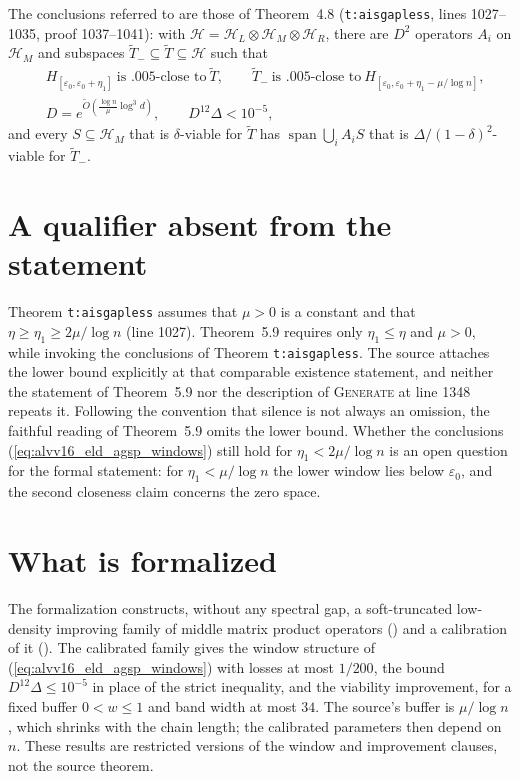 \documentclass{article}
\begin{document}
The conclusions referred to are those of Theorem~4.8
(\texttt{t:aisgapless}, lines 1027--1035, proof 1037--1041): with $\mathcal H=\mathcal H_L\otimes
\mathcal H_M\otimes\mathcal H_R$, there are $D^2$ operators $A_i$ on
$\mathcal H_M$ and subspaces $\tilde T_-\subseteq\tilde T\subseteq\mathcal H$
such that
\begin{align}
 &H_{[\varepsilon_0,\varepsilon_0+\eta_1]}\ \text{is $.005$-close to}\ \tilde T,
 \qquad
 \tilde T_-\ \text{is $.005$-close to}\
 H_{[\varepsilon_0,\varepsilon_0+\eta_1-\mu/\log n]},
 \label{eq:alvv16_eld_agsp_windows}\\
 &D=e^{\tilde O(\frac{\log n}{\mu}\log^3 d)},\qquad D^{12}\Delta<10^{-5},
 \label{eq:alvv16_eld_agsp_count}
\end{align}
and every $S\subseteq\mathcal H_M$ that is $\delta$-viable for $\tilde T$ has
$\operatorname{span}\bigcup_iA_iS$ that is $\Delta/(1-\delta)^2$-viable for
$\tilde T_-$.

\section{A qualifier absent from the statement}

Theorem \texttt{t:aisgapless} assumes that $\mu>0$ is a constant and that
$\eta\geq\eta_1\geq2\mu/\log n$ (line 1027). Theorem~5.9 requires only
$\eta_1\leq\eta$ and $\mu>0$, while invoking the conclusions of Theorem
\texttt{t:aisgapless}. The source attaches the lower bound explicitly at that
comparable existence statement, and neither the statement of Theorem~5.9 nor
the description of \textsc{Generate} at line 1348 repeats it. Following the
convention that silence is not always an omission, the faithful reading of
Theorem~5.9 omits the lower bound. Whether the conclusions
(\ref{eq:alvv16_eld_agsp_windows}) still hold for $\eta_1<2\mu/\log n$ is an
open question for the formal statement: for $\eta_1<\mu/\log n$ the lower window
lies below $\varepsilon_0$, and the second closeness claim concerns the zero
space.

\section{What is formalized}

The formalization constructs, without any spectral gap, a soft-truncated
low-density improving family of middle matrix product operators
() and
a calibration of it
().
The calibrated family gives the window structure of
(\ref{eq:alvv16_eld_agsp_windows}) with losses at most $1/200$, the bound
$D^{12}\Delta\leq10^{-5}$ in place of the strict inequality, and the viability
improvement, for a fixed buffer $0<w\leq1$ and band width at most $34$. The
source's buffer is $\mu/\log n$, which shrinks with the chain length; the
calibrated parameters then depend on $n$. These results are restricted versions
of the window and improvement clauses, not the source theorem.
\end{document}
